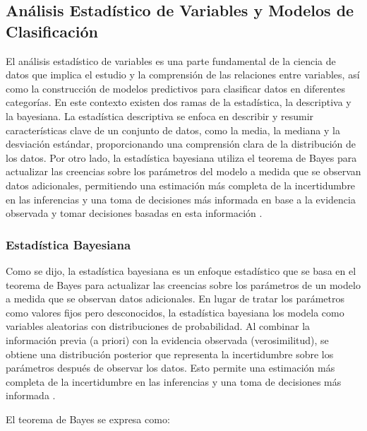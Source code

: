 \vspace{2mm}



\subsection{Análisis Estadístico de Variables y Modelos de Clasificación}

\vspace{1mm}
\normalsize

El análisis estadístico de variables es una parte fundamental de la ciencia de datos que implica el estudio y la comprensión de las relaciones entre variables, así como la construcción de modelos predictivos para clasificar datos en diferentes categorías. En este contexto existen dos ramas de la estadística, la descriptiva y la bayesiana. La estadística descriptiva se enfoca en describir y resumir características clave de un conjunto de datos, como la media, la mediana y la desviación estándar, proporcionando una comprensión clara de la distribución de los datos. Por otro lado, la estadística bayesiana utiliza el teorema de Bayes para actualizar las creencias sobre los parámetros del modelo a medida que se observan datos adicionales, permitiendo una estimación más completa de la incertidumbre en las inferencias y una toma de decisiones más informada en base a la evidencia observada y tomar decisiones basadas en esta información \cite{McClave2016_lz}.


\subsubsection{Estadística Bayesiana}

Como se dijo, la estadística bayesiana es un enfoque estadístico que se basa en el teorema de Bayes para actualizar las creencias sobre los parámetros de un modelo a medida que se observan datos adicionales. En lugar de tratar los parámetros como valores fijos pero desconocidos, la estadística bayesiana los modela como variables aleatorias con distribuciones de probabilidad. Al combinar la información previa (a priori) con la evidencia observada (verosimilitud), se obtiene una distribución posterior que representa la incertidumbre sobre los parámetros después de observar los datos. Esto permite una estimación más completa de la incertidumbre en las inferencias y una toma de decisiones más informada \cite{Gelman2013_ay}.

El teorema de Bayes se expresa como:

